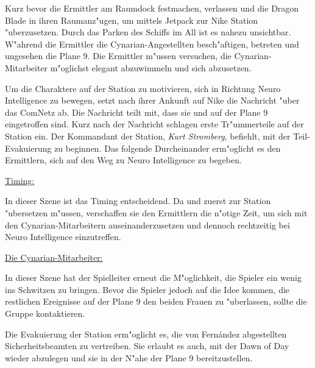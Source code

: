 Kurz bevor die Ermittler am Raumdock festmachen, verlassen \xl{} und \ml{} die Dragon Blade in ihren Raumanz"ugen, um mittels Jetpack zur Nike Station "uberzusetzen. Durch das Parken des Schiffs im All ist es nahezu unsichtbar. W"ahrend die Ermittler die Cynarian-Angestellten besch"aftigen, betreten \xl{} und \ml{} ungesehen die Plane 9. Die Ermittler m"ussen versuchen, die Cynarian-Mitarbeiter m"oglichst elegant abzuwimmeln und sich abzusetzen.

Um die Charaktere auf der Station zu motivieren, sich in Richtung Neuro Intelligence zu bewegen, setzt \ml{} nach ihrer Ankunft auf Nike die Nachricht  "uber das ComNetz ab. Die Nachricht teilt mit, dass sie und \xl{} auf der Plane 9 eingetroffen sind. Kurz nach der Nachricht schlagen erste Tr"ummerteile auf der Station ein. Der Kommandant der Station, \emph{Kurt Stromberg}, befiehlt, mit der Teil-Evakuierung zu beginnen. Das folgende Durcheinander erm"oglicht es den Ermittlern, sich auf den Weg zu Neuro Intelligence zu begeben. 

\begin{remarks}
	\underline{Timing:}

	In dieser Szene ist das Timing entscheidend. Da \xl{} und \ml{} zuerst zur Station "ubersetzen m"ussen, verschaffen sie den Ermittlern die n"otige Zeit, um sich mit den Cynarian-Mitarbeitern auseinanderzusetzen und dennoch rechtzeitig bei Neuro Intelligence einzutreffen.

	\underline{Die Cynarian-Mitarbeiter:}

	In dieser Szene hat der Spielleiter erneut die M"oglichkeit, die Spieler ein wenig ins Schwitzen zu bringen. Bevor die Spieler jedoch auf die Idee kommen, die restlichen Ereignisse auf der Plane 9 den beiden Frauen zu "uberlassen, sollte \ml{} die Gruppe kontaktieren.

	Die Evakuierung der Station erm"oglicht es, die von Fern\'andez abgestellten Sicherheitsbeamten zu vertreiben. Sie erlaubt es auch, mit der Dawn of Day wieder abzulegen und sie in der N"ahe der Plane 9 bereitzustellen.
\end{remarks}
